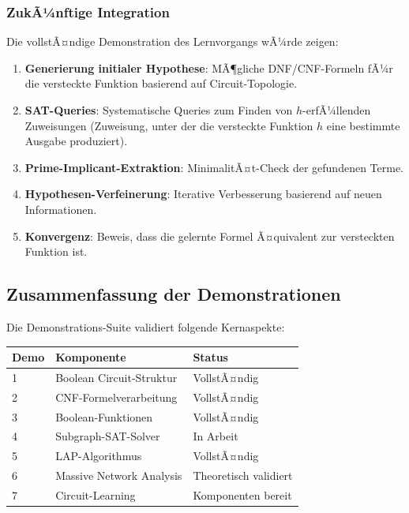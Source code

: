 ﻿\documentclass[a4paper,12pt]{article}
\theoremstyle{definition}
\begin{document}
\subsubsection{ZukÃ¼nftige Integration}

Die vollstÃ¤ndige Demonstration des Lernvorgangs wÃ¼rde zeigen:
\begin{enumerate}
    \item \textbf{Generierung initialer Hypothese}: MÃ¶gliche DNF/CNF-Formeln fÃ¼r die versteckte Funktion basierend auf Circuit-Topologie.
    
    \item \textbf{SAT-Queries}: Systematische Queries zum Finden von $h$-erfÃ¼llenden Zuweisungen (Zuweisung, unter der die versteckte Funktion $h$ eine bestimmte Ausgabe produziert).
    
    \item \textbf{Prime-Implicant-Extraktion}: MinimalitÃ¤t-Check der gefundenen Terme.
    
    \item \textbf{Hypothesen-Verfeinerung}: Iterative Verbesserung basierend auf neuen Informationen.
    
    \item \textbf{Konvergenz}: Beweis, dass die gelernte Formel Ã¤quivalent zur versteckten Funktion ist.
\end{enumerate}

\subsection{Zusammenfassung der Demonstrationen}

Die Demonstrations-Suite validiert folgende Kernaspekte:

\begin{center}
\begin{tabular}{lll}
\toprule
\textbf{Demo} & \textbf{Komponente} & \textbf{Status} \\
\midrule
1 & Boolean Circuit-Struktur & VollstÃ¤ndig \\
2 & CNF-Formelverarbeitung & VollstÃ¤ndig \\
3 & Boolean-Funktionen & VollstÃ¤ndig \\
4 & Subgraph-SAT-Solver & In Arbeit \\
5 & LAP-Algorithmus & VollstÃ¤ndig \\
6 & Massive Network Analysis & Theoretisch validiert \\
7 & Circuit-Learning & Komponenten bereit \\
\bottomrule
\end{tabular}
\end{center}
\end{document}
